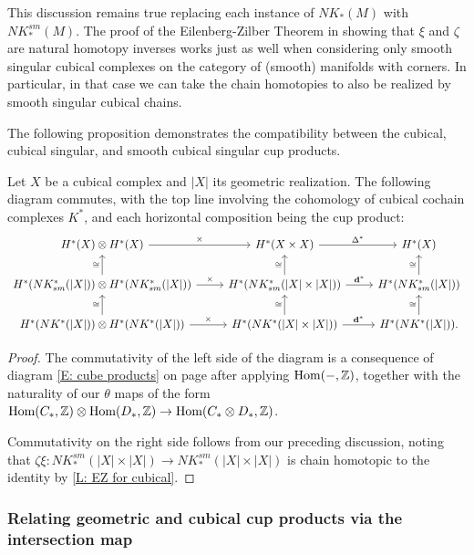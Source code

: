 \begin{remark}\label{R: smooth Massey}
This discussion remains true replacing each instance of $NK_*(M)$ with $NK_*^{sm}(M)$.
The proof of the Eilenberg-Zilber Theorem in \cite[Section XI.5]{Mas91} showing that $\xi$ and $\zeta$ are natural homotopy inverses works just as well when considering only smooth singular cubical complexes on the category of (smooth) manifolds with corners.
In particular, in that case we can take the chain homotopies to also be realized by smooth singular cubical chains.
\end{remark}

The following proposition demonstrates the compatibility between the cubical, cubical singular, and smooth cubical singular cup products.

\begin{proposition}\label{P: cubical and singular cups}
	Let $X$ be a cubical complex and $|X|$ its geometric realization.
	The following diagram commutes, with the top line involving the cohomology of cubical cochain complexes $K^*$, and each horizontal composition being the cup product:
	\[
	\begin{tikzcd}
	H^*(X) \otimes H^*(X) \arrow[r,"\times"]& H^*(X \times X) \arrow[r,"\Delta^*"] & H^*(X)\\
	H^*(NK^*_{sm}(|X|)) \otimes H^*(NK^*_{sm}(|X|)) \arrow[r,"\times"]\arrow[u,"\cong"] & H^*(NK^*_{sm}(|X| \times |X|)) \arrow[r,"\diag^*"]\arrow[u,"\cong"] & H^*(NK^*_{sm}(|X|))\arrow[u,"\cong"]\\
	H^*(NK^*(|X|)) \otimes H^*(NK^*(|X|))\arrow[r,"\times"]\arrow[u,"\cong"] & H^*(NK^*(|X| \times |X|)) \arrow[u,"\cong"]\arrow[r,"\diag^*"] &H^*(NK^*(|X|))\arrow[u,"\cong"].
	\end{tikzcd}
	\]
\end{proposition}
\begin{proof}
The commutativity of the left side of the diagram is a consequence of diagram \eqref{E: cube products} on page \pageref{E: cube products} after applying $\textup{Hom}(-,\mathbb{Z})$,  together with the naturality of our $\theta$ maps of the form $\textup{Hom}(C_*,\mathbb{Z}) \otimes \textup{Hom}(D_*,\mathbb{Z}) \to \textup{Hom}(C_* \otimes D_*,\mathbb{Z})$.

Commutativity on the right side follows from our preceding discussion, noting that $\zeta \xi \colon NK_*^{sm}(|X| \times |X|) \to NK_*^{sm}(|X| \times |X|)$ is chain homotopic to the identity by \cref{L: EZ for cubical}.
\end{proof}


\subsubsection{Relating geometric and cubical cup products via the intersection map}\label{S: cup via intersection}


